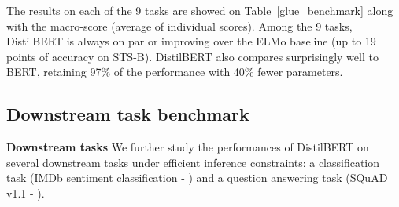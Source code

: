 \documentclass{article}
\begin{document}
The results on each of the 9 tasks are showed on Table~\ref{glue_benchmark} along with the macro-score (average of individual scores). Among the 9 tasks, DistilBERT is always on par or improving over the ELMo baseline (up to 19 points of accuracy on STS-B). DistilBERT also compares surprisingly well to BERT, retaining 97\% of the performance with 40\% fewer parameters.

\begin{table}
  \caption{\textbf{DistilBERT retains 97\% of BERT performance.} Comparison on the dev sets of the GLUE benchmark. ELMo results as reported by the authors. BERT and DistilBERT results are the medians of 5 runs with different seeds.}
  \label{glue_benchmark}
  \centering
\end{table}

\subsection{Downstream task benchmark}

\textbf{Downstream tasks} We further study the performances of DistilBERT on several downstream tasks under efficient inference constraints: a classification task (IMDb sentiment classification - \citet{Maas2011LearningWV}) and a question answering task (SQuAD v1.1 - \citet{Rajpurkar2016SQuAD10}).
\end{document}
